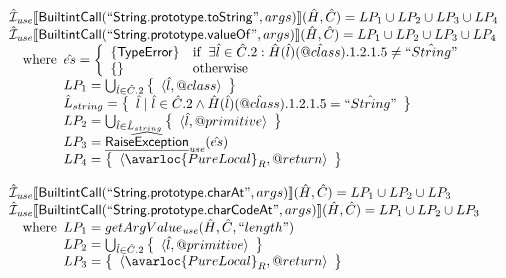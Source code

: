 \[
\begin{array}{l}

\aI_{\it use}\lbr \SF{BuiltintCall}(``\SF{String.prototype.toString}",args)\rbr(\hat{H},\hat{C}) = LP_1 \cup LP_2 \cup LP_3 \cup LP_4\\
\aI_{\it use}\lbr \SF{BuiltintCall}(``\SF{String.prototype.valueOf}",args)\rbr(\hat{H},\hat{C}) = LP_1 \cup LP_2 \cup LP_3 \cup LP_4\\
\quad\wherec{
  \hat{es} = \left\{\begin{array}{ll}
      \{ \SF{TypeError} \}
      & \ifc{\exists\hat{l}\in\hat{C}.2: \hat{H}(\hat{l})(\avarprop{class}).1.2.1.5 \neq \hat{``String"}}\\
      \set{} & \owc
    \end{array}\right.\\
  LP_1 = \bigcup_{\hat{l} \in \hat{C}.2} \set{\langle \hat{l},\varprop{class} \rangle}\\
  \hat{L}_{string} = \set{\hat{l} \mid \hat{l} \in \hat{C}.2 \land \hat{H}(\hat{l})(\avarprop{class}).1.2.1.5 = \hat{``String"}}\\
  LP_2 = \bigcup_{\hat{l} \in \hat{L}_{string}} \set{\langle \hat{l},\varprop{primitive} \rangle}\\
  LP_3 = \ahf{RaiseException}_{\it use}(\hat{es})\\
  LP_4 = \set{\langle\avarloc{PureLocal}_R,\varprop{return}\rangle}\\
  }\\
\\

\aI_{\it use}\lbr \SF{BuiltintCall}(``\SF{String.prototype.charAt}",args)\rbr(\hat{H},\hat{C}) = LP_1 \cup LP_2 \cup LP_3\\
\aI_{\it use}\lbr \SF{BuiltintCall}(``\SF{String.prototype.charCodeAt}",args)\rbr(\hat{H},\hat{C}) = LP_1 \cup LP_2 \cup LP_3\\
\quad\wherec{
  LP_1 = getArgValue_{\it use}(\hat{H}, \hat{C}, ``length")\\
  LP_2 = \bigcup_{\hat{l} \in \hat{C}.2} \set{\langle \hat{l},\varprop{primitive} \rangle}\\
  LP_3 = \set{\langle\avarloc{PureLocal}_R,\varprop{return}\rangle}\\
  }\\
\\


\end{array}\]
